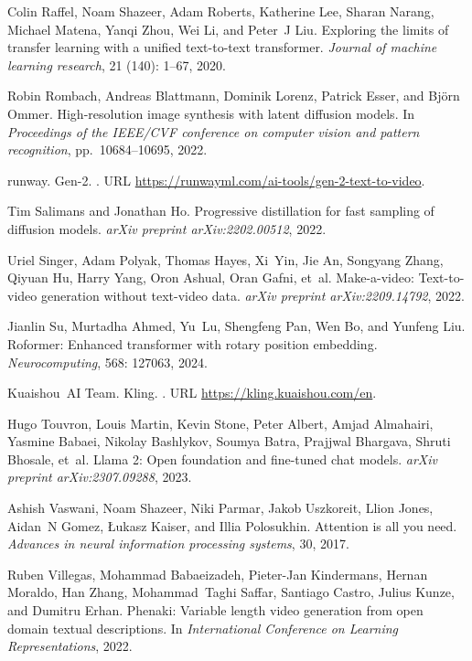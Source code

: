\documentclass{article} \usepackage{iclr2024_conference,times}
\begin{document}
\begin{thebibliography}{45}
Colin Raffel, Noam Shazeer, Adam Roberts, Katherine Lee, Sharan Narang, Michael Matena, Yanqi Zhou, Wei Li, and Peter~J Liu.
\newblock Exploring the limits of transfer learning with a unified text-to-text transformer.
\newblock \emph{Journal of machine learning research}, 21 (140): 1--67, 2020.

Robin Rombach, Andreas Blattmann, Dominik Lorenz, Patrick Esser, and Bj{\"o}rn Ommer.
\newblock High-resolution image synthesis with latent diffusion models.
\newblock In \emph{Proceedings of the IEEE/CVF conference on computer vision and pattern recognition}, pp.\  10684--10695, 2022.

runway.
\newblock Gen-2.
.
\newblock URL \url{https://runwayml.com/ai-tools/gen-2-text-to-video}.

Tim Salimans and Jonathan Ho.
\newblock Progressive distillation for fast sampling of diffusion models.
\newblock \emph{arXiv preprint arXiv:2202.00512}, 2022.

Uriel Singer, Adam Polyak, Thomas Hayes, Xi~Yin, Jie An, Songyang Zhang, Qiyuan Hu, Harry Yang, Oron Ashual, Oran Gafni, et~al.
\newblock Make-a-video: Text-to-video generation without text-video data.
\newblock \emph{arXiv preprint arXiv:2209.14792}, 2022.

Jianlin Su, Murtadha Ahmed, Yu~Lu, Shengfeng Pan, Wen Bo, and Yunfeng Liu.
\newblock Roformer: Enhanced transformer with rotary position embedding.
\newblock \emph{Neurocomputing}, 568: 127063, 2024.

Kuaishou~AI Team.
\newblock Kling.
.
\newblock URL \url{https://kling.kuaishou.com/en}.

Hugo Touvron, Louis Martin, Kevin Stone, Peter Albert, Amjad Almahairi, Yasmine Babaei, Nikolay Bashlykov, Soumya Batra, Prajjwal Bhargava, Shruti Bhosale, et~al.
\newblock Llama 2: Open foundation and fine-tuned chat models.
\newblock \emph{arXiv preprint arXiv:2307.09288}, 2023.

Ashish Vaswani, Noam Shazeer, Niki Parmar, Jakob Uszkoreit, Llion Jones, Aidan~N Gomez, {\L}ukasz Kaiser, and Illia Polosukhin.
\newblock Attention is all you need.
\newblock \emph{Advances in neural information processing systems}, 30, 2017.

Ruben Villegas, Mohammad Babaeizadeh, Pieter-Jan Kindermans, Hernan Moraldo, Han Zhang, Mohammad~Taghi Saffar, Santiago Castro, Julius Kunze, and Dumitru Erhan.
\newblock Phenaki: Variable length video generation from open domain textual descriptions.
\newblock In \emph{International Conference on Learning Representations}, 2022.


\end{thebibliography}
\end{document}
